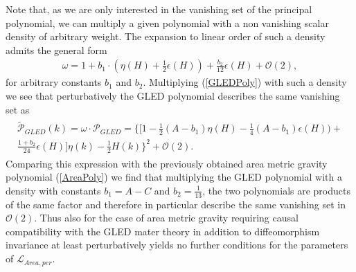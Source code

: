 \documentclass[a4paper,12pt, DIV=14, BCOR=5mm, twoside, headsepline]{scrbook}
\begin{document}
Note that, as we are only interested in the vanishing set of the principal polynomial, we can multiply a given polynomial with a non vanishing scalar density of arbitrary weight. The expansion to linear order of such a density admits the general form
\begin{align}\label{dens}
\omega = 1+ b_1 \cdot (\eta(H) + \frac{1}{2} \epsilon(H)) + \frac{b_2}{12}\epsilon(H) + \mathcal{O}(2),
\end{align}
for arbitrary constants $b_1$ and $b_2$.
Multiplying  (\ref{GLEDPoly}) with such a density we see that perturbatively the GLED polynomial describes the same vanishing set as 
\begin{align} \label{GLEDPoly2}
\begin{aligned}
    \widetilde{\mathcal{P}}_{GLED}(k) = \omega \cdot \mathcal{P}_{GLED} = 
    \bigl\{  \bigl[ 1 - \frac{1}{2} (A-b_1) \eta(H) - \frac{1}{4} (A-b_1) \epsilon(H)) + \\ \frac{1+b_2}{24} \epsilon(H) \bigr] \eta(k)
    -\frac{1}{2} H(k)       \bigr\}^2 + \mathcal{O}(2).
\end{aligned}
\end{align}
Comparing this expression with the previously obtained area metric gravity polynomial (\ref{AreaPoly}) we find that multiplying the GLED polynomial with a density with constants $b_1 = A -C$ and $b_2 = \frac{1}{13}$, the two polynomials are products of the same factor and therefore in particular describe the same vanishing set in $\mathcal{O}(2)$. Thus also for the case of area metric gravity requiring causal compatibility with the GLED mater theory in addition to diffeomorphism invariance at least perturbatively yields no further conditions for the parameters of $\mathcal{L}_{Area,per}$.\\
\end{document}
